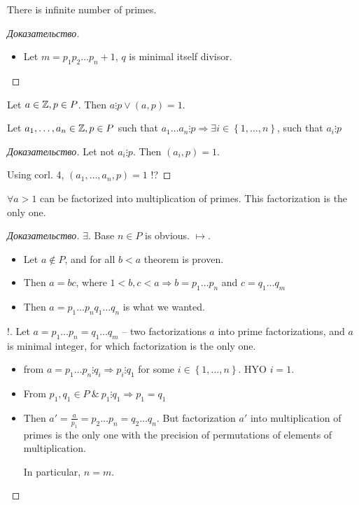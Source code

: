 \begin{theorem}[]
	There is infinite number of primes.
\end{theorem}

\begin{proof}[Доказательство]
	\begin{itemize}
		\item Let $m = p_1p_2 \dots p_n + 1$, $q$ is minimal itself divisor.
	\end{itemize}
\end{proof}

\begin{property}[]
	Let $a \in \mathbb{Z}, p \in P$. Then $a \vdots p \vee (a,p) = 1$.
\end{property}

\begin{property}[]
	Let $a_1, \dots , a_n \in \mathbb{Z}, p \in P$ such that $a_1 \dots a_n \vdots p \Rightarrow \exists i \in \left\{ 1, \dots , n \right \} $, such that $a_i \vdots p$
\end{property}

\begin{proof}[Доказательство]
	Let not $a_i \vdots p$. Then $(a_i, p) = 1$.

	Using corl. 4,  $(a_1, \dots , a_n, p) = 1$ !?
\end{proof}

\begin{theorem}[OTA]
	$\forall a > 1$ can be factorized into multiplication of primes. This factorization is the only one.
\end{theorem}

\begin{proof}[Доказательство]
	$\exists $. Base $n \in P$ is obvious.
	$ \mapsto $. \begin{itemize}
		\item Let $a \notin P$, and for all $b < a$ theorem is proven.
		\item Then $a = bc$, where $1 < b, c < a \Rightarrow b = p_1 \dots p_n$ and $c = q_1 \dots q_m$
		\item Then $a = p_1 \dots p_n q_1 \dots q_n$ is what we wanted. 
	\end{itemize}

	!. Let $a = p_1 \dots  p_n = q_1 \dots q_m$ -- two factorizations $a$ into prime factorizations, and $a$ is minimal integer, for which factorization is the only one.
	 \begin{itemize}
		\item from $a = p_1 \dots p_n \vdots q_i \Rightarrow p_i \vdots q_1$ for some $i \in \left\{ 1, \dots , n \right \} $. HYO $i = 1$.
		\item From $p_1, q_1 \in P \ \& \ p_1 \vdots q_1 \Rightarrow p_1 = q_1$
		\item Then $a' = \frac{a}{p_1} = p_2 \dots p_n = q_2 \dots q_n$. But factorization $a'$ into multiplication of primes is the only one with the precision of permutations of elements of multiplication. 
		\begin{note}[]
			In particular, $n = m$.
		\end{note}
	\end{itemize}
\end{proof}

